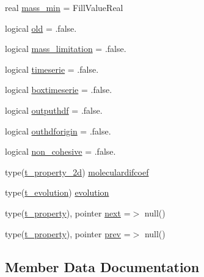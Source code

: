 \begin{DoxyCompactItemize}
real \mbox{\hyperlink{structmoduleinterfacesedimentwater_1_1t__property_af9e3381e6dd2dbac55cedb0a14cabd16}{mass\+\_\+min}} = Fill\+Value\+Real
\item 
logical \mbox{\hyperlink{structmoduleinterfacesedimentwater_1_1t__property_a5eace4061d6af7557b6bc9c08e0ea99a}{old}} = .false.
\item 
logical \mbox{\hyperlink{structmoduleinterfacesedimentwater_1_1t__property_ae8366aa1d6367f92e28669b10b30e1ae}{mass\+\_\+limitation}} = .false.
\item 
logical \mbox{\hyperlink{structmoduleinterfacesedimentwater_1_1t__property_ae3b0549d677d611a4bc2991a3328fd66}{timeserie}} = .false.
\item 
logical \mbox{\hyperlink{structmoduleinterfacesedimentwater_1_1t__property_a0ad382e5cca0652b5bf8acfa24518469}{boxtimeserie}} = .false.
\item 
logical \mbox{\hyperlink{structmoduleinterfacesedimentwater_1_1t__property_afb103909c21123208dbe3143ed36a2eb}{outputhdf}} = .false.
\item 
logical \mbox{\hyperlink{structmoduleinterfacesedimentwater_1_1t__property_a93d2d1bfbba3bddb697190b930e89728}{outhdforigin}} = .false.
\item 
logical \mbox{\hyperlink{structmoduleinterfacesedimentwater_1_1t__property_a9ee5dd4aeadd3bfc2b17ec6ebf2d579d}{non\+\_\+cohesive}} = .false.
\item 
type(\mbox{\hyperlink{structmoduleinterfacesedimentwater_1_1t__property__2d}{t\+\_\+property\+\_\+2d}}) \mbox{\hyperlink{structmoduleinterfacesedimentwater_1_1t__property_ac208b7668c83b7e412011baa247944a0}{moleculardifcoef}}
\item 
type(\mbox{\hyperlink{structmoduleinterfacesedimentwater_1_1t__evolution}{t\+\_\+evolution}}) \mbox{\hyperlink{structmoduleinterfacesedimentwater_1_1t__property_adb3d0d8f42f73dc5e1d2653c7f019042}{evolution}}
\item 
type(\mbox{\hyperlink{structmoduleinterfacesedimentwater_1_1t__property}{t\+\_\+property}}), pointer \mbox{\hyperlink{structmoduleinterfacesedimentwater_1_1t__property_a1862d13bdeb428a9931e0acf2c108fc6}{next}} =$>$ null()
\item 
type(\mbox{\hyperlink{structmoduleinterfacesedimentwater_1_1t__property}{t\+\_\+property}}), pointer \mbox{\hyperlink{structmoduleinterfacesedimentwater_1_1t__property_a88c3f80614663d53720fa233d537df20}{prev}} =$>$ null()
\end{DoxyCompactItemize}


\subsection{Member Data Documentation}
\mbox{\label{structmoduleinterfacesedimentwater_1_1t__property_a0ad382e5cca0652b5bf8acfa24518469}} 
